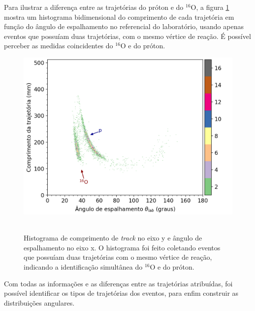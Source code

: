 \documentclass[a4paper,12pt,oneside]{book}
\begin{document}

\par Para ilustrar a diferença entre as trajetórias do próton e do $^{16}$O, a figura \ref{fig:coincidencia_detec} mostra um histograma bidimensional do comprimento de cada trajetória em função do ângulo de espalhamento no referencial do laboratório, usando apenas eventos que possuíam duas trajetórias, com o mesmo vértice de reação. É possível perceber as medidas coincidentes do $^{16}$O e do próton.

\begin{figure}[H]
    \centering
    \includegraphics[scale = 0.75]{figs/coincidencias_tpc.png}\
    \caption{Histograma de comprimento de \textit{track} no eixo y e ângulo de espalhamento no eixo x. O histograma foi feito coletando eventos que possuíam duas trajetórias com o mesmo vértice de reação, indicando a identificação simultânea do $^{16}$O e do próton.}
    \label{fig:coincidencia_detec}
\end{figure}

\par Com todas as informações e as diferenças entre as trajetórias atribuídas, foi possível identificar os tipos de trajetórias dos eventos, para enfim construir as distribuições angulares.
\end{document}
